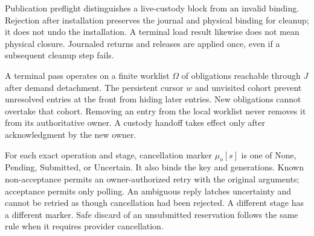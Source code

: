 Publication preflight distinguishes a live-custody block from an invalid
binding. Rejection after installation preserves the journal and physical
binding for cleanup; it does not undo the installation. A terminal load
result likewise does not mean physical closure. Journaled returns and
releases are applied once, even if a subsequent cleanup step fails.

A terminal pass operates on a finite worklist $\Omega$ of obligations
reachable through $J$ after demand detachment. The persistent cursor $w$
and unvisited cohort prevent unresolved entries at the front from hiding
later entries. New obligations cannot overtake that cohort. Removing an
entry from the local worklist never removes it from its authoritative owner.
A custody handoff takes effect only after acknowledgment by the new owner.

For each exact operation and stage, cancellation marker $\mu_o[s]$ is one of
\textsf{None}, \textsf{Pending}, \textsf{Submitted}, or \textsf{Uncertain}.
It also binds the key and generations. Known non-acceptance permits an
owner-authorized retry with the original arguments; acceptance permits only
polling. An ambiguous reply latches uncertainty and cannot be retried as
though cancellation had been rejected. A different stage has a different
marker. Safe discard of an unsubmitted reservation follows the same rule
when it requires provider cancellation.

